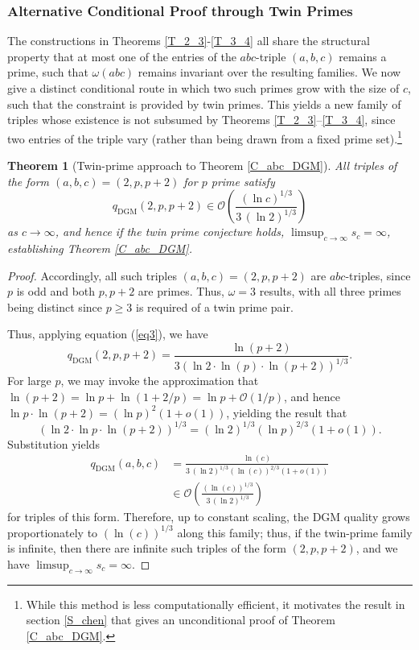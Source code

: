 \documentclass[11pt,letterpaper]{amsart}
\newtheorem{theorem}{Theorem}[section]
\def\ra{\rightarrow}
\begin{document}
\subsubsection{Alternative Conditional Proof through Twin Primes}

The constructions in Theorems \ref{T_2_3}-\ref{T_3_4}  all share the structural property that at most one of the entries of the $abc$-triple $(a, b, c)$ remains a prime, such that $\omega(abc)$ remains invariant over the resulting families. We now give a distinct conditional route in which two such primes grow with the size of $c$, such that the constraint is provided by twin primes. This yields a new family of triples whose existence is not subsumed by Theorems \ref{T_2_3}–\ref{T_3_4}, since two entries of the triple vary (rather than being drawn from a fixed prime set).\footnote{While this method is less computationally efficient, it motivates the result in section \ref{S_chen} that gives an unconditional proof of Theorem \ref{C_abc_DGM}.}

\begin{theorem}[Twin-prime approach to Theorem \ref{C_abc_DGM}]\label{T_twin_DGM}
All triples of the form $(a,b,c)=(2,p,p+2)$ for $p$ prime satisfy
\[
q_{\mathrm{DGM}}(2,p,p+2) \in \mathcal{O} \left( \frac{(\ln c)^{1/3}}{3\,(\ln 2)^{1/3}} \right)
\]
as $c \ra \infty$, and hence if the twin prime conjecture holds, $\limsup_{c\to\infty} s_c=\infty$, establishing Theorem \ref{C_abc_DGM}.
\end{theorem}
\begin{proof}
Accordingly, all such triples $(a, b, c) = (2, p, p + 2)$ are $abc$-triples, since $p$ is odd and both $p, p + 2$ are primes. Thus, $\omega = 3$ results, with all three primes being distinct since $p\ge 3$ is required of a twin prime pair.

Thus, applying equation (\ref{eq3}), we have
\[
q_{\mathrm{DGM}}(2,p,p+2)=\frac{\ln(p+2)}{3 \left(\ln 2\cdot\ln(p)\cdot \ln(p+2) \right)^{1/3}}.
\]
For large $p$, we may invoke the approximation that $\ln(p+2)=\ln p+\ln(1+2/p)=\ln p+\mathcal{O}(1/p)$, and hence $\ln p\cdot\ln(p+2)=(\ln p)^2(1+o(1))$, yielding the result that
\[
({\ln 2\cdot \ln p\cdot \ln(p+2)})^{1/3} = (\ln 2)^{1/3}(\ln p)^{2/3}(1+o(1)).
\]
Substitution yields
\begin{align*}
q_{\mathrm{DGM}}(a, b, c) &= \frac{\ln(c)}{3\,(\ln 2)^{1/3}(\ln(c))^{2/3} (1+o(1))} \\& \in \mathcal{O}\left( \frac{(\ln(c))^{1/3}}{3\,(\ln 2)^{1/3}} \right)
\end{align*}
for triples of this form. Therefore, up to constant scaling, the DGM quality grows proportionately to $(\ln(c))^{1/3}$ along this family; thus, if the twin-prime family is infinite, then there are infinite such triples of the form $(2, p, p + 2)$, and we have $\limsup_{c \ra \infty} s_c=\infty$.
\end{proof}
\end{document}
